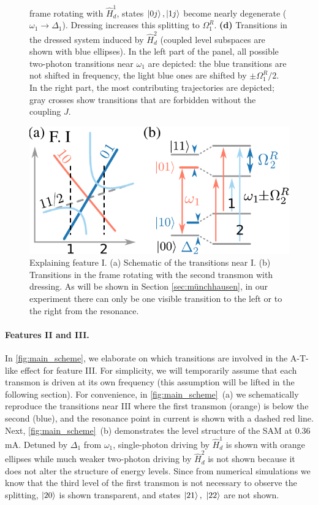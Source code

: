 \documentclass[%
 pra,
 amsmath,amssymb,
 reprint,%
]{revtex4-1}
\begin{document}
\begin{figure}
{	frame rotating with $\hat 
	H_{d}^1$, states $\ket{0j},\ket{1j}$ 
	become nearly degenerate ($\omega_1 
	\rightarrow \Delta_1$). Dressing increases this splitting to 
	$\Omega_1^R$. \textbf{(d)} Transitions in the 
	dressed system induced by $\hat 
	H_{d}^2$ (coupled level subspaces are shown with blue ellipses). In 
	the left part of the panel, all possible 
	two-photon transitions near $\omega_1$ are 
	depicted: the blue transitions are not 
	shifted in frequency, the light blue ones are shifted 
	by $\pm\Omega^R_1/2$. In the right 
	part, the most contributing trajectories are 
	depicted; gray crosses show transitions that 
	are forbidden without the coupling $J$.}
	\label{fig:main_scheme}
\end{figure}

\begin{figure}
	\includegraphics[width=.9\linewidth]{topo_scheme}
	\caption{Explaining feature I. (a) Schematic of the transitions near I. (b) Transitions in the frame rotating with the second transmon with dressing. As will be shown in Section \ref{sec:münchhausen}, in our experiment there can only be one visible transition to the left or to the right from the resonance.}
	\label{fig:featureI}
\end{figure} 

\paragraph{Features II and III.}  

In \autoref{fig:main_scheme}, we elaborate on which transitions
are involved in the A-T-like effect for feature III. 
For simplicity, we will temporarily assume that 
each transmon is driven at its own frequency 
(this assumption will be lifted in the following 
section). For convenience, in 
\autoref{fig:main_scheme}~(a) we schematically 
reproduce the transitions near III where the 
first transmon (orange) is below the second 
(blue), and the resonance point in current is 
shown with a dashed red line. Next, 
\autoref{fig:main_scheme}~(b) demonstrates the 
level structure of the SAM at 0.36 mA. Detuned by 
$\Delta_1$ from $\omega_1$, single-photon driving by 
$\hat H_d^1$ is shown with orange ellipses while 
much weaker two-photon driving by $\hat H_d^2$ is not shown because it does not alter the structure of energy levels. Since from numerical simulations we know 
that the third level of the first transmon is not 
necessary to observe the splitting, $\ket{20}$ is 
shown transparent, and states $\ket{21},\ 
\ket{22}$ are not shown.
\end{document}
